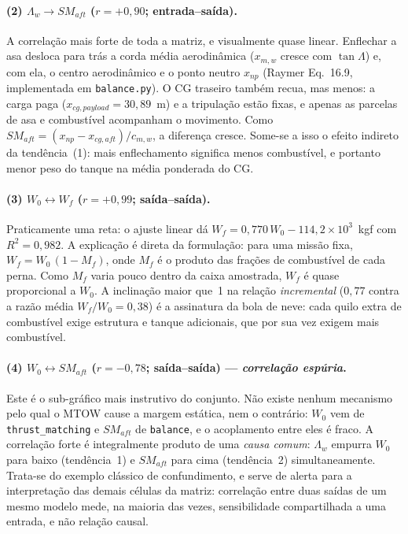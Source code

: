 \documentclass[11pt,a4paper]{article}
\newcommand{\code}[1]{\texttt{\small #1}}
\begin{document}
\paragraph{(2) $\Lambda_w \to SM_{aft}$ \; ($r = +0{,}90$; entrada--sa\'ida).}
A correla\c{c}\~ao mais forte de toda a matriz, e visualmente quase linear.
Enflechar a asa desloca para tr\'as a corda m\'edia aerodin\^amica
($x_{m,w}$ cresce com $\tan\Lambda$) e, com ela, o centro aerodin\^amico e o
ponto neutro $x_{np}$ (Raymer Eq.~16.9, implementada em \code{balance.py}).
O CG traseiro tamb\'em recua, mas menos: a carga paga
($x_{cg,payload} = 30{,}89$~m) e a tripula\c{c}\~ao est\~ao fixas, e apenas as
parcelas de asa e combust\'ivel acompanham o movimento. Como
$SM_{aft} = (x_{np} - x_{cg,aft})/c_{m,w}$, a diferen\c{c}a cresce. Some-se a
isso o efeito indireto da tend\^encia~(1): mais enflechamento significa menos
combust\'ivel, e portanto menor peso do tanque na m\'edia ponderada do CG.

\paragraph{(3) $W_0 \leftrightarrow W_f$ \; ($r = +0{,}99$; sa\'ida--sa\'ida).}
Praticamente uma reta: o ajuste linear d\'a
$W_f = 0{,}770\,W_0 - 114{,}2\times10^3$~kgf com $R^2 = 0{,}982$. A
explica\c{c}\~ao \'e direta da formula\c{c}\~ao: para uma miss\~ao fixa,
$W_f = W_0\,(1 - M_f)$, onde $M_f$ \'e o produto das fra\c{c}\~oes de
combust\'ivel de cada perna. Como $M_f$ varia pouco dentro da caixa amostrada,
$W_f$ \'e quase proporcional a $W_0$. A inclina\c{c}\~ao maior que~1 na
rela\c{c}\~ao \emph{incremental} ($0{,}77$ contra a raz\~ao m\'edia
$W_f/W_0 = 0{,}38$) \'e a assinatura da bola de neve: cada quilo extra de
combust\'ivel exige estrutura e tanque adicionais, que por sua vez exigem mais
combust\'ivel.

\paragraph{(4) $W_0 \leftrightarrow SM_{aft}$ \; ($r = -0{,}78$;
sa\'ida--sa\'ida) --- \emph{correla\c{c}\~ao esp\'uria}.}
Este \'e o sub-gr\'afico mais instrutivo do conjunto. N\~ao existe nenhum
mecanismo pelo qual o MTOW cause a margem est\'atica, nem o contr\'ario:
$W_0$ vem de \code{thrust\_matching} e $SM_{aft}$ de \code{balance}, e o
acoplamento entre eles \'e fraco. A correla\c{c}\~ao forte \'e integralmente
produto de uma \emph{causa comum}: $\Lambda_w$ empurra $W_0$ para baixo
(tend\^encia~1) e $SM_{aft}$ para cima (tend\^encia~2) simultaneamente. Trata-se
do exemplo cl\'assico de confundimento, e serve de alerta para a
interpreta\c{c}\~ao das demais c\'elulas da matriz: correla\c{c}\~ao entre duas
sa\'idas de um mesmo modelo mede, na maioria das vezes, sensibilidade
compartilhada a uma entrada, e n\~ao rela\c{c}\~ao causal.
\end{document}
